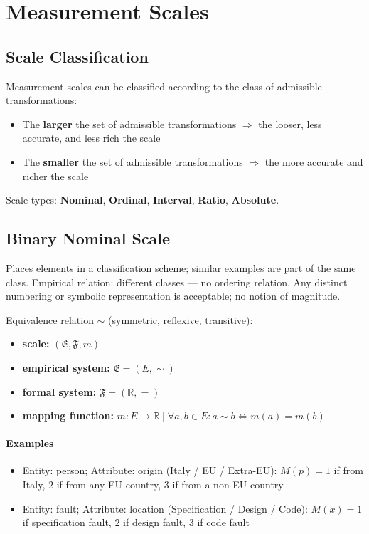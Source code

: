 \section{Measurement Scales}

\subsection{Scale Classification}

Measurement scales can be classified according to the class of admissible transformations:
\begin{itemize}
  \item The \textbf{larger} the set of admissible transformations $\Rightarrow$ the looser,
        less accurate, and less rich the scale
  \item The \textbf{smaller} the set of admissible transformations $\Rightarrow$ the more
        accurate and richer the scale
\end{itemize}

Scale types: \textbf{Nominal}, \textbf{Ordinal}, \textbf{Interval}, \textbf{Ratio}, \textbf{Absolute}.

\subsection{Binary Nominal Scale}

Places elements in a classification scheme; similar examples are part of the same class.
Empirical relation: different classes — no ordering relation.
Any distinct numbering or symbolic representation is acceptable; no notion of magnitude.

Equivalence relation $\sim$ (symmetric, reflexive, transitive):

\begin{itemize}
  \item \textbf{scale:} $(\mathfrak{E},\mathfrak{F},m)$
  \item \textbf{empirical system:} $\mathfrak{E}=(E,\sim)$
  \item \textbf{formal system:} $\mathfrak{F}=(\mathbb{R},=)$
  \item \textbf{mapping function:} $m:E\rightarrow\mathbb{R} \mid \forall a,b\in E:a\sim b\iff m(a)=m(b)$
\end{itemize}

\paragraph{Examples}
\begin{itemize}
  \item Entity: person; Attribute: origin (Italy / EU / Extra-EU):
        $M(p) = 1$ if from Italy, $2$ if from any EU country, $3$ if from a non-EU country
  \item Entity: fault; Attribute: location (Specification / Design / Code):
        $M(x) = 1$ if specification fault, $2$ if design fault, $3$ if code fault
\end{itemize}

